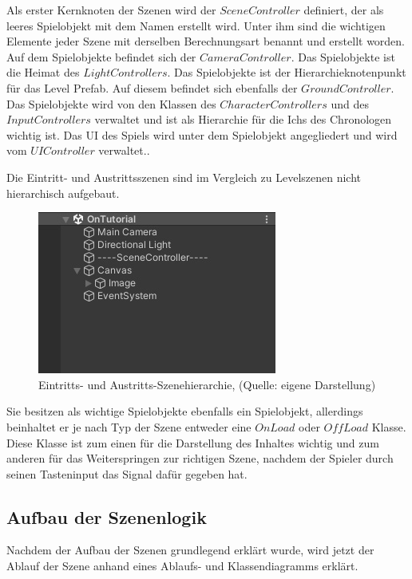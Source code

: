 Als erster Kernknoten der Szenen wird der $SceneController$ definiert, der als leeres Spielobjekt mit dem Namen  erstellt wird. Unter ihm sind die wichtigen Elemente jeder Szene mit derselben Berechnungsart benannt und erstellt worden. Auf dem Spielobjekte  befindet sich der $CameraController$. Das Spielobjekte  ist die Heimat des $LightControllers$. Das Spielobjekte  ist der Hierarchieknotenpunkt für das Level Prefab. Auf diesem befindet sich ebenfalls der $GroundController$. Das Spielobjekte  wird von den Klassen des $CharacterControllers$ und des $InputControllers$ verwaltet und ist als Hierarchie für die Ichs des Chronologen wichtig ist. Das \ac{UI} des Spiels wird unter dem Spielobjekt  angegliedert und wird vom $UIController$ verwaltet.. 

Die Eintritt- und Austrittsszenen sind im Vergleich zu Levelszenen nicht hierarchisch aufgebaut.

\begin{figure}[ht]
\centering
\includegraphics[width=0.6\linewidth]{content/pictures/Detail_on_off.jpg}
\caption{Eintritts- und Austritts-Szenehierarchie, (Quelle: eigene Darstellung)}
\label{fig:on_of_load_hierachy}
\end{figure}

Sie besitzen als wichtige Spielobjekte ebenfalls ein  Spielobjekt, allerdings beinhaltet er je nach Typ der Szene entweder eine $OnLoad$ oder $OffLoad$ Klasse. Diese Klasse ist zum einen für die Darstellung des Inhaltes wichtig und zum anderen für das Weiterspringen zur richtigen Szene, nachdem der Spieler durch seinen Tasteninput das Signal dafür gegeben hat.

\subsection{Aufbau der Szenenlogik}\label{sec:scene-loop}
Nachdem der Aufbau der Szenen grundlegend erklärt wurde, wird jetzt der Ablauf der Szene anhand eines Ablaufs- und Klassendiagramms erklärt.

